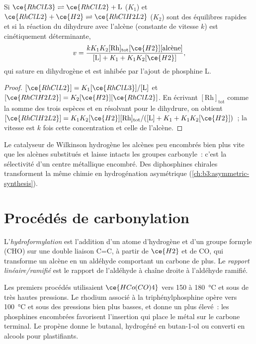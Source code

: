 \begin{proposition}\label{prop:b3:homogeneous-catalysis:wilkinson-rate}
Si $\ce{RhClL3} \rightleftharpoons \ce{RhClL2} + \mathrm L$ ($K_1$) et $\ce{RhClL2} + \ce{H2} \rightleftharpoons \ce{RhClH2L2}$ ($K_2$) sont des
équilibres rapides et si la réaction du dihydrure avec l'alcène (constante
de vitesse $k$) est cinétiquement déterminante,
\[
  v = \frac{kK_1K_2[\mathrm{Rh}]_{\mathrm{tot}}[\ce{H2}][\text{alcène}]}{[\mathrm L] + K_1 + K_1K_2[\ce{H2}]},
\]
qui sature en dihydrogène et est inhibée par l'ajout de phosphine L.
\end{proposition}

\begin{proof}
$[\ce{RhClL2}] = K_1[\ce{RhClL3}]/[\mathrm L]$ et $[\ce{RhClH2L2}] = K_2[\ce{H2}][\ce{RhClL2}]$. En écrivant $[\mathrm{Rh}]_{\mathrm{tot}}$ comme la
somme des trois espèces et en résolvant pour le dihydrure, on obtient $[\ce{RhClH2L2}] =
K_1K_2[\ce{H2}][\mathrm{Rh}]_{\mathrm{tot}}/([\mathrm L] + K_1 + K_1K_2[\ce{H2}])$~; la vitesse est $k$ fois cette concentration et celle
de l'alcène.
\end{proof}

Le catalyseur de Wilkinson hydrogène les alcènes peu encombrés bien plus
vite que les alcènes substitués et laisse intacts les groupes carbonyle~:
c'est la sélectivité d'un centre métallique encombré. Des diphosphines
chirales transforment la même chimie en hydrogénation asymétrique
(\cref{ch:b3:asymmetric-synthesis}).

\section{Procédés de carbonylation}

\begin{definition}[Hydroformylation]\label{def:b3:homogeneous-catalysis:hydroformylation}
L'\emph{hydroformylation} est l'addition d'un atome
d'hydrogène et d'un groupe formyle (CHO) sur une double liaison C=C, à
partir de $\ce{H2}$ et de CO, qui transforme un alcène en un aldéhyde comportant un
carbone de plus. Le \emph{rapport linéaire/ramifié} est le rapport
de l'aldéhyde à chaîne droite à l'aldéhyde ramifié.
\end{definition}

Les premiers procédés utilisaient $\ce{HCo(CO)4}$ vers 150 à \qty{180}{\celsius} et sous de
très hautes pressions. Le rhodium associé à la triphénylphosphine opère vers
\qty{100}{\celsius} et sous des pressions bien plus basses, et donne un
 plus élevé~: les phosphines encombrées favorisent
l'insertion qui place le métal sur le carbone terminal. Le propène donne le
butanal, hydrogéné en butan-1-ol ou converti en alcools pour plastifiants.

